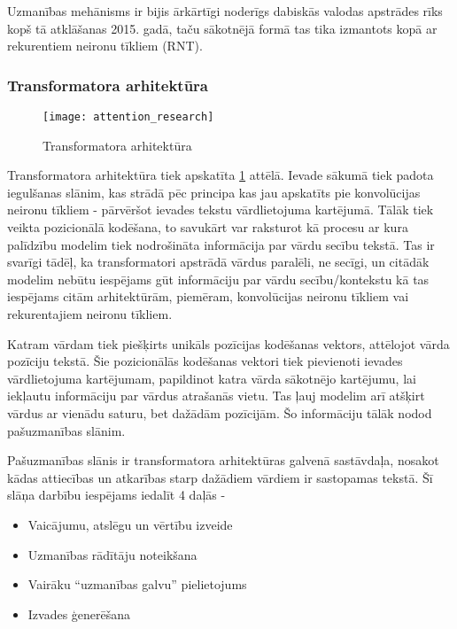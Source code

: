 Uzmanības mehānisms ir bijis ārkārtīgi noderīgs dabiskās valodas apstrādes rīks kopš tā atklāšanas 2015. gadā, taču sākotnējā formā tas tika izmantots kopā ar rekurentiem neironu tīkliem (RNT). 

\subsubsection{Transformatora arhitektūra}

\begin{figure}[H]
	\texttt{[image: attention\_research]}
	\caption{Transformatora arhitektūra \cite{vaswani2023attention} }
	\label{fig:vaswani2023attention_img}
\end{figure}

Transformatora arhitektūra tiek apskatīta \ref{fig:vaswani2023attention_img} attēlā. Ievade sākumā tiek padota iegulšanas slānim, kas strādā pēc principa kas jau apskatīts pie konvolūcijas neironu tīkliem - pārvēršot ievades tekstu vārdlietojuma kartējumā. Tālāk tiek veikta pozicionālā kodēšana, to savukārt var raksturot kā procesu ar kura palīdzību modelim tiek nodrošināta informācija par vārdu secību tekstā. Tas ir svarīgi tādēļ, ka transformatori apstrādā vārdus paralēli, ne secīgi, un citādāk modelim nebūtu iespējams gūt informāciju par vārdu secību/kontekstu kā tas iespējams citām arhitektūrām, piemēram, konvolūcijas neironu tīkliem vai rekurentajiem neironu tīkliem.

Katram vārdam tiek piešķirts unikāls pozīcijas  kodēšanas vektors, attēlojot vārda pozīciju tekstā. Šie pozicionālās kodēšanas vektori tiek pievienoti ievades vārdlietojuma kartējumam, papildinot katra vārda sākotnējo kartējumu, lai iekļautu informāciju par vārdus atrašanās vietu. Tas ļauj modelim arī atšķirt vārdus ar vienādu saturu, bet dažādām pozīcijām. Šo informāciju tālāk nodod pašuzmanības slānim.

Pašuzmanības slānis ir transformatora arhitektūras galvenā sastāvdaļa, nosakot kādas attiecības un atkarības starp dažādiem vārdiem ir sastopamas tekstā. Šī slāņa darbību iespējams iedalīt 4 daļās - 
\begin{itemize}
\item Vaicājumu, atslēgu un vērtību izveide
\item Uzmanības rādītāju noteikšana
\item Vairāku “uzmanības galvu” pielietojums
\item Izvades ģenerēšana
\end{itemize}

